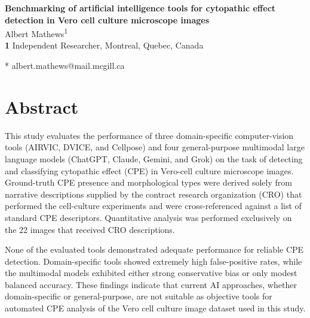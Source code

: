 \documentclass[10pt,letterpaper]{article}
\begin{document}
\vspace*{0.2in}

\begin{flushleft}
{\Large
\textbf{Benchmarking of artificial intelligence tools for cytopathic effect detection in Vero cell culture microscope images} %
}
\newline
\\
Albert Mathews\textsuperscript{1}
\\
\bigskip
\textbf{1} Independent Researcher, Montreal, Quebec, Canada
\\
\bigskip

* albert.mathews@mail.mcgill.ca

\end{flushleft}
\section*{Abstract}
This study evaluates the performance of three domain-specific computer-vision tools (AIRVIC, DVICE, and Cellpose) and four general-purpose multimodal large language models (ChatGPT, Claude, Gemini, and Grok) on the task of detecting and classifying cytopathic effect (CPE) in Vero-cell culture microscope images. Ground-truth CPE presence and morphological types were derived solely from narrative descriptions supplied by the contract research organization (CRO) that performed the cell-culture experiments and were cross-referenced against a list of standard CPE descriptors. Quantitative analysis was performed exclusively on the 22 images that received CRO descriptions.

None of the evaluated tools demonstrated adequate performance for reliable CPE detection. Domain-specific tools showed extremely high false-positive rates, while the multimodal models exhibited either strong conservative bias or only modest balanced accuracy. These findings indicate that current AI approaches, whether domain-specific or general-purpose, are not suitable as objective tools for automated CPE analysis of the Vero cell culture image dataset used in this study.
\end{document}
